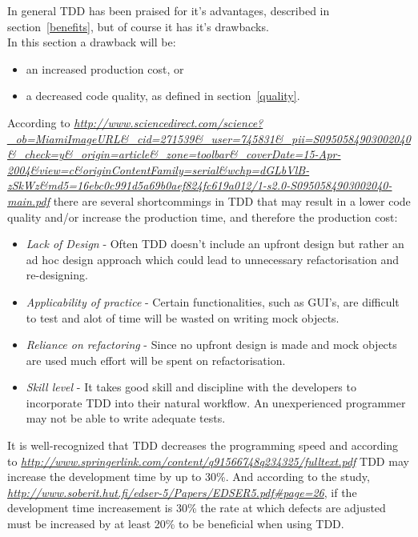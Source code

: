 In general TDD has been praised for it's advantages, described in section~\ref{benefits}, but of course it has it's drawbacks.\\

\noindent In this section a drawback will be:
\begin{itemize}
\item an increased production cost, or
\item a decreased code quality, as defined in section~\ref{quality}.
\end{itemize}

According to \textit{\url{http://www.sciencedirect.com/science?_ob=MiamiImageURL&_cid=271539&_user=745831&_pii=S0950584903002040&_check=y&_origin=article&_zone=toolbar&_coverDate=15-Apr-2004&view=c&originContentFamily=serial&wchp=dGLbVlB-zSkWz&md5=16ebc0c991d5a69b0aef824fc619a012/1-s2.0-S0950584903002040-main.pdf}} there are several shortcommings in TDD that may result in a lower code quality and/or increase the production time, and therefore the production cost:
\begin{itemize}
 \item \textit{Lack of Design} - Often TDD doesn't include an upfront design but rather an ad hoc design approach which could lead to unnecessary refactorisation and re-designing. 
 \item \textit{Applicability of practice} - Certain functionalities, such as GUI's, are difficult to test and alot of time will be wasted on writing mock objects.
 \item \textit{Reliance on refactoring} - Since no upfront design is made and mock objects are used much effort will be spent on refactorisation.
 \item \textit{Skill level} - It takes good skill and discipline with the developers to incorporate TDD into their natural workflow. An unexperienced programmer may not be able to write adequate tests.\\
\end{itemize}

\noindent It is well-recognized that TDD decreases the programming speed and according to \textit{\url{http://www.springerlink.com/content/q91566748q234325/fulltext.pdf}} TDD may increase the development time by up to 30\%. 
And according to the study, \textit{\url{http://www.soberit.hut.fi/edser-5/Papers/EDSER5.pdf\#page=26}}, if the development time increasement is 30\% the rate at which defects are adjusted must be increased by at least 20\% to be beneficial when using TDD.
